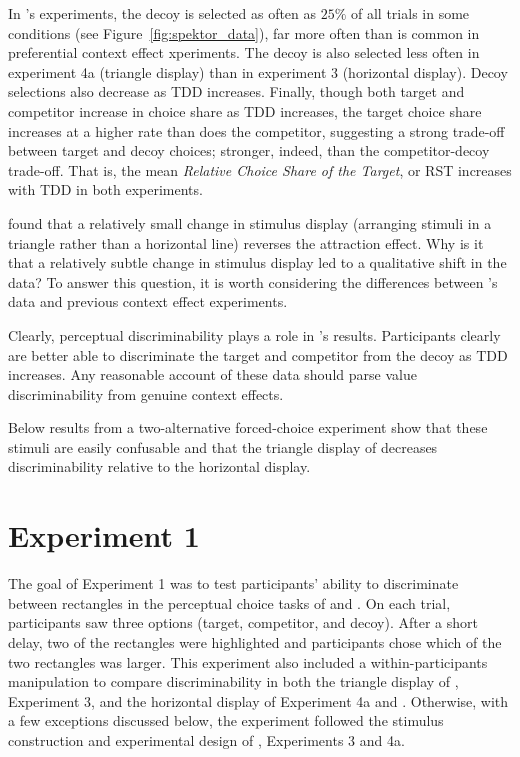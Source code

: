 In \textcite{spektorWhenGoodLooks2018b}'s experiments, the decoy is selected as often as $25\%$ of all trials in some conditions (see Figure~\ref{fig:spektor_data}), far more often than is common in preferential context effect xperiments. The decoy is also selected less often in experiment 4a (triangle display) than in experiment 3 (horizontal display). Decoy selections also decrease as TDD increases. Finally, though both target and competitor increase in choice share as TDD increases, the target choice share increases at a higher rate than does the competitor, suggesting a strong trade-off between target and decoy choices; stronger, indeed, than the competitor-decoy trade-off. That is, the mean \textit{Relative Choice Share of the Target}, or RST \parencite{berkowitschRigorouslyTestingMultialternative2014b} increases with TDD in both experiments. 

\textcite{spektorWhenGoodLooks2018b} found that a relatively small change in stimulus display (arranging stimuli in a triangle rather than a horizontal line) reverses the attraction effect. Why is it that a relatively subtle change in stimulus display led to a qualitative shift in the data? To answer this question, it is worth considering the differences between \textcite{spektorWhenGoodLooks2018b}'s data and previous context effect experiments. 

Clearly, perceptual discriminability plays a role in \textcite{spektorWhenGoodLooks2018b}'s results. Participants clearly are better able to discriminate the target and competitor from the decoy as TDD increases. Any reasonable account of these data should parse value discriminability from genuine context effects.

Below results from a two-alternative forced-choice experiment show that these stimuli are easily confusable and that the triangle display of \textcite{spektorWhenGoodLooks2018b} decreases discriminability relative to the horizontal display. 

\section{Experiment 1}

The goal of Experiment 1 was to test participants' ability to discriminate between rectangles in the perceptual choice tasks of \textcite{trueblood2013not} and \textcite{spektorWhenGoodLooks2018b}. 
On each trial, participants saw three options (target, competitor, and decoy). After a short delay, two of the rectangles were highlighted and participants chose which of the two rectangles was larger. 
This experiment also included a within-participants manipulation to compare discriminability in both the triangle display of \textcite{spektorWhenGoodLooks2018b}, Experiment 3, and the horizontal display of \textcite{spektorWhenGoodLooks2018b} Experiment 4a and \textcite{trueblood2013not}. Otherwise, with a few exceptions discussed below, the experiment followed the stimulus construction and experimental design of \textcite{spektorWhenGoodLooks2018b}, Experiments 3 and 4a. 

